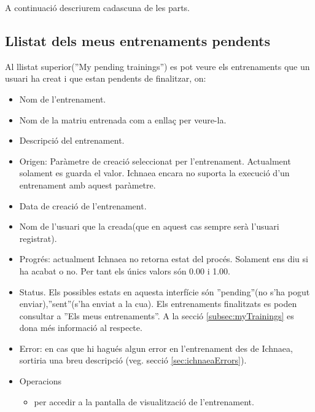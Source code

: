 A continuaci\'{o} descriurem cadascuna de les parts.

\subsection{Llistat dels meus entrenaments pendents}
Al llistat superior(''My pending trainings'') es pot veure els entrenaments que un usuari ha creat i que estan pendents de finalitzar, on: 
\begin{itemize}
\item Nom de l'entrenament.
\item Nom de la matriu entrenada com a enllaç per veure-la.
\item Descripci\'{o} del entrenament.
\item Origen: Paràmetre de creació seleccionat per l'entrenament. Actualment solament es guarda el valor. Ichnaea encara no suporta la execució d'un entrenament amb aquest paràmetre.
\item Data de creaci\'{o} de l'entrenament.
\item Nom de l'usuari que la creada(que en aquest cas sempre serà l'usuari registrat).
\item Progr\'{e}s: actualment Ichnaea no retorna estat del proc\'{e}s. Solament ens diu si ha acabat o no. Per tant els \'{u}nics valors s\'{o}n 0.00 i 1.00.
\item Status. Els possibles estats en aquesta interfície s\'{o}n ''pending''(no s'ha pogut enviar),''sent''(s'ha enviat a la cua). Els entrenaments finalitzats es poden consultar a ''Els meus entrenaments''. A la secció \ref{subsec:myTrainings} es dona m\'{e}s informació al respecte.
\item Error: en cas que hi hagués algun error en l'entrenament des de Ichnaea, sortiria una breu descripció (veg. secció  \ref{sec:ichnaeaErrors}).
\item Operacions
 \begin{itemize}
 \item \iconeyeopen per accedir a la pantalla de visualització de l'entrenament.
 \end{itemize}
\end{itemize}

